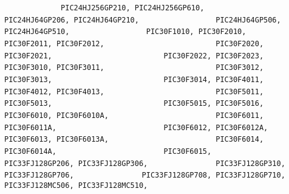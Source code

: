 {{{{\lstinline!             PIC24HJ256GP210, PIC24HJ256GP610,  ! \newline
\lstinline!             PIC24HJ64GP206, PIC24HJ64GP210,    ! \newline
\lstinline!             PIC24HJ64GP506, PIC24HJ64GP510,    ! \newline
\newline
\lstinline!             PIC30F1010, PIC30F2010,            ! \newline
\lstinline!             PIC30F2011, PIC30F2012,            ! \newline
\lstinline!             PIC30F2020, PIC30F2021,            ! \newline
\lstinline!             PIC30F2022, PIC30F2023,            ! \newline
\lstinline!             PIC30F3010, PIC30F3011,            ! \newline
\lstinline!             PIC30F3012, PIC30F3013,            ! \newline
\lstinline!             PIC30F3014, PIC30F4011,            ! \newline
\lstinline!             PIC30F4012, PIC30F4013,            ! \newline
\lstinline!             PIC30F5011, PIC30F5013,            ! \newline
\lstinline!             PIC30F5015, PIC30F5016,            ! \newline
\lstinline!             PIC30F6010, PIC30F6010A,           ! \newline
\lstinline!             PIC30F6011, PIC30F6011A,           ! \newline
\lstinline!             PIC30F6012, PIC30F6012A,           ! \newline
\lstinline!             PIC30F6013, PIC30F6013A,           ! \newline
\lstinline!             PIC30F6014, PIC30F6014A,           ! \newline
\lstinline!             PIC30F6015,                        ! \newline
\newline
\lstinline!             PIC33FJ128GP206, PIC33FJ128GP306,  ! \newline
\lstinline!             PIC33FJ128GP310, PIC33FJ128GP706,  ! \newline
\lstinline!             PIC33FJ128GP708, PIC33FJ128GP710,  ! \newline
\lstinline!             PIC33FJ128MC506, PIC33FJ128MC510,  ! \newline
}}}}

